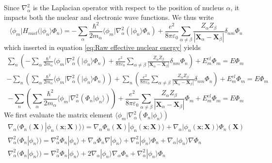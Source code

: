 \documentclass[11pt,a4paper]{article}
\begin{document}
Since $\nabla_\alpha^2$ is the Laplacian operator with respect to the position of nucleus $\alpha$, it impacts both the nuclear and electronic wave functions. We thus write
\begin{equation*}
	\langle\phi_m | H_{nucl} (|\phi_n\rangle \Phi_n) = -\sum_\alpha \frac{\hbar^2}{2m_\alpha} \langle\phi_m | \nabla_\alpha^2 (|\phi_n\rangle \Phi_n) + \frac{e^2}{8\pi\varepsilon_0} \sum_{\alpha \neq \beta} \frac{Z_\alpha Z_\beta}{|\mathbf{X}_\alpha - \mathbf{X}_\beta|} \delta_{nm} \Phi_n
\end{equation*}
which inserted in equation \eqref{eq:Raw effective nuclear energy} yields
\begin{equation*}
	\begin{gathered}
		\sum_n \left( -\sum_\alpha \frac{\hbar^2}{2m_\alpha} \langle\phi_m | \nabla_\alpha^2 (|\phi_n\rangle \Phi_n) + \frac{e^2}{8\pi\varepsilon_0} \sum_{\alpha \neq \beta} \frac{Z_\alpha Z_\beta}{|\mathbf{X}_\alpha - \mathbf{X}_\beta|} \delta_{nm} \Phi_n \right) + E_m^{el} \Phi_m = E \Phi_m \\[6pt]
		-\sum_n \left( \sum_\alpha \frac{\hbar^2}{2m_\alpha} \langle\phi_m | \nabla_\alpha^2 (|\phi_n\rangle \Phi_n) \right) + \sum_n \left( \frac{e^2}{8\pi\varepsilon_0} \sum_{\alpha \neq \beta} \frac{Z_\alpha Z_\beta}{|\mathbf{X}_\alpha - \mathbf{X}_\beta|} \delta_{nm} \Phi_n \right) + E_m^{el} \Phi_m = E \Phi_m
	\end{gathered}
\end{equation*}
\begin{equation}
	\label{eq:Raw effective nuclear energy bis}
	-\sum_n \left( \sum_\alpha \frac{\hbar^2}{2m_\alpha} \langle\phi_m | \nabla_\alpha^2 (\Phi_n |\phi_n\rangle) \right) + \frac{e^2}{8\pi\varepsilon_0} \sum_{\alpha \neq \beta} \frac{Z_\alpha Z_\beta}{|\mathbf{X}_\alpha - \mathbf{X}_\beta|} \Phi_m + E_m^{el} \Phi_m = E \Phi_m
\end{equation}
We first evaluate the matrix element $\langle\phi_m | \nabla_\alpha^2 (\Phi_n |\phi_n\rangle)$
\begin{equation*}
	\begin{gathered}
		\nabla_\alpha (\Phi_n(\mathbf{X}) |\phi_n(\mathbf{x}; \mathbf{X})\rangle) = \nabla_\alpha \Phi_n(\mathbf{X}) |\phi_n(\mathbf{x}; \mathbf{X})\rangle + \nabla_\alpha |\phi_n(\mathbf{x}; \mathbf{X})\rangle \Phi_n(\mathbf{X}) \\[6pt]
		\nabla_\alpha^2 (\Phi_n |\phi_n\rangle) = \nabla_\alpha^2 \Phi_n |\phi_n\rangle + \nabla_\alpha \Phi_n \nabla |\phi_n\rangle + \nabla_\alpha^2 |\phi_n\rangle \Phi_n + \nabla_\alpha |\phi_n\rangle \nabla\Phi_n \\[6pt]
		\nabla_\alpha^2 (\Phi_n |\phi_n\rangle) = \nabla_\alpha^2 \Phi_n |\phi_n\rangle + 2 \nabla_\alpha |\phi_n\rangle \nabla_\alpha \Phi_n + \nabla_\alpha^2 |\phi_n\rangle \Phi_n
	\end{gathered}
\end{equation*}
\end{document}
